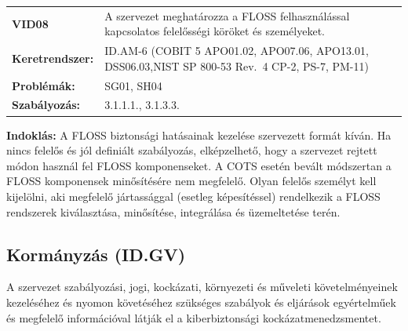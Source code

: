 \documentclass[12pt,magyar,a4paper,oneside]{scrreprt}
\begin{document}
\begin{longtable}[]{@{}ll@{}}
\toprule
\endhead
\begin{minipage}[t]{0.16\columnwidth}\raggedright
\textbf{VID08}\strut
\end{minipage} & \begin{minipage}[t]{0.79\columnwidth}\raggedright
A szervezet meghatározza a FLOSS felhasználással kapcsolatos felelősségi
köröket és személyeket.\strut
\end{minipage}\tabularnewline
\begin{minipage}[t]{0.16\columnwidth}\raggedright
\textbf{Keretrendszer:}\strut
\end{minipage} & \begin{minipage}[t]{0.79\columnwidth}\raggedright
ID.AM-6 (COBIT 5 APO01.02, APO07.06, APO13.01, DSS06.03,NIST SP 800-53
Rev.~4 CP-2, PS-7, PM-11)\strut
\end{minipage}\tabularnewline
\begin{minipage}[t]{0.16\columnwidth}\raggedright
\textbf{Problémák:}\strut
\end{minipage} & \begin{minipage}[t]{0.79\columnwidth}\raggedright
SG01, SH04\strut
\end{minipage}\tabularnewline
\begin{minipage}[t]{0.16\columnwidth}\raggedright
\textbf{Szabályozás:}\strut
\end{minipage} & \begin{minipage}[t]{0.79\columnwidth}\raggedright
3.1.1.1., 3.1.3.3.\strut
\end{minipage}\tabularnewline
\bottomrule
\end{longtable}

\textbf{Indoklás: } A FLOSS biztonsági hatásainak kezelése szervezett
formát kíván. Ha nincs felelős és jól definiált szabályozás,
elképzelhető, hogy a szervezet rejtett módon használ fel FLOSS
komponenseket. A COTS esetén bevált módszertan a FLOSS komponensek
minősítésére nem megfelelő. Olyan felelős személyt kell kijelölni, aki
megfelelő jártassággal (esetleg képesítéssel) rendelkezik a FLOSS
rendszerek kiválasztása, minősítése, integrálása és üzemeltetése terén.

\hypertarget{kormuxe1nyzuxe1s-id.gv}{%
\subsection{Kormányzás (ID.GV)}\label{kormuxe1nyzuxe1s-id.gv}}

A szervezet szabályozási, jogi, kockázati, környezeti és műveleti
követelményeinek kezeléséhez és nyomon követéséhez szükséges szabályok
és eljárások egyértelműek és megfelelő információval látják el a
kiberbiztonsági kockázatmenedzsmentet.
\end{document}
